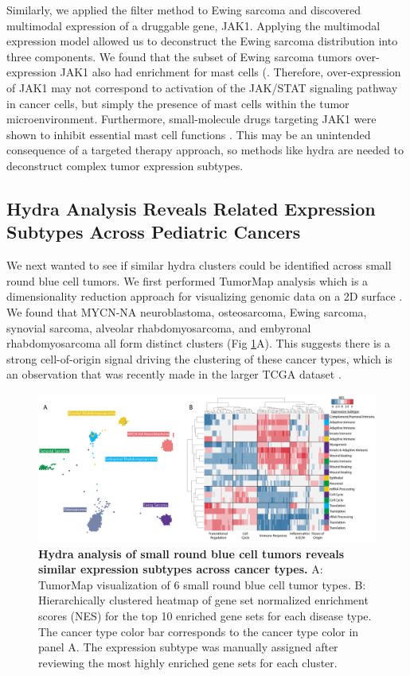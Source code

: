 \documentclass[10pt,letterpaper]{article}
\begin{document}
Similarly, we applied the filter method to Ewing sarcoma and discovered multimodal expression of a druggable gene, JAK1. Applying the multimodal expression model allowed us to deconstruct the Ewing sarcoma distribution into three components. We found that the subset of Ewing sarcoma tumors over-expression JAK1 also had enrichment for mast cells (. Therefore, over-expression of JAK1 may not correspond to activation of the JAK/STAT signaling pathway in cancer cells, but simply the presence of mast cells within the tumor microenvironment. Furthermore, small-molecule drugs targeting JAK1 were shown to inhibit essential mast cell functions \cite{hermansJAK1JAK2Inhibitor2018}. This may be an unintended consequence of a targeted therapy approach, so methods like hydra are needed to deconstruct complex tumor expression subtypes.

\subsection{Hydra Analysis Reveals Related Expression Subtypes Across Pediatric Cancers}
We next wanted to see if similar hydra clusters could be identified across small round blue cell tumors. We first performed TumorMap analysis which is a dimensionality reduction approach for visualizing genomic data on a 2D surface \cite{newtonTumorMapExploringMolecular2017}. We found that MYCN-NA neuroblastoma, osteosarcoma, Ewing sarcoma, synovial sarcoma, alveolar rhabdomyosarcoma, and embyronal rhabdomyosarcoma all form distinct clusters (Fig \ref{pancan}A). This suggests there is a strong cell-of-origin signal driving the clustering of these cancer types, which is an observation that was recently made in the larger TCGA dataset \cite{Hoadley2014}. 

\begin{figure}[!h]
	\includegraphics[width=1.05\textwidth]{img/hydra-pan-small-round-blue-V2-2x}
	\caption{{\bf Hydra analysis of small round blue cell tumors reveals similar expression subtypes across cancer types.} A: TumorMap visualization of 6 small round blue cell tumor types. B: Hierarchically clustered heatmap of gene set normalized enrichment scores (NES) for the top 10 enriched gene sets for each disease type. The cancer type color bar corresponds to the cancer type color in panel A. The expression subtype was manually assigned after reviewing the most highly enriched gene sets for each cluster.}
	\label{pancan}
\end{figure}
\end{document}
